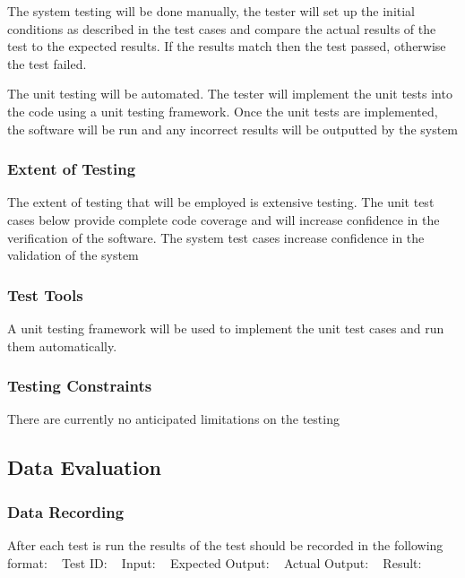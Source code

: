 \documentclass[12pt]{article}
\begin{document}
The system testing will be done manually, the tester will set up the initial conditions as described in the test cases
and compare the actual results of the test to the expected results. If the results match then the test passed, otherwise
the test failed.  

The unit testing will be automated. The tester will implement the unit tests into the code using a unit testing framework. Once 
the unit tests are implemented, the software will be run and any incorrect results will be outputted by the system

\subsubsection{Extent of Testing}
The extent of testing that will be employed is extensive testing. The unit test cases below provide complete code coverage and 
will increase confidence in the verification of the software. The system test cases increase confidence in the validation of the system

\subsubsection{Test Tools}
A unit testing framework will be used to implement the unit test cases and run them automatically.

\subsubsection{Testing Constraints}
There are currently no anticipated limitations on the testing

\subsection{Data Evaluation}

\subsubsection{Data Recording}
After each test is run the results of the test should be recorded in the following format: 
~\newline
Test ID: 
~\newline
Input:
~\newline
Expected Output:
~\newline
Actual Output:
~\newline
Result: 
\end{document}

